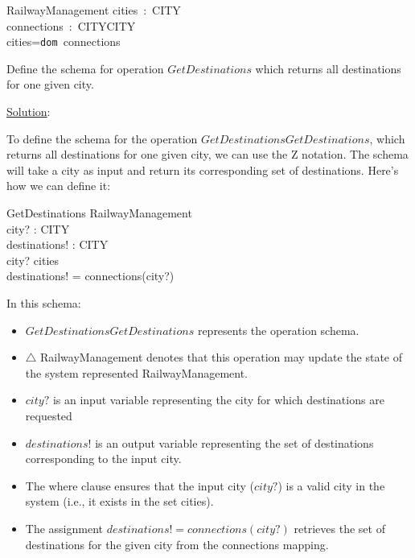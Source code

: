 \documentclass[12pt]{article}
\begin{document}
\begin{spacing}{1.5}
\begin{enumerate}
		      \begin{schema}{RailwayManagement}
		      	cities~:~CITY\\
		      	connections~:~CITY\nrightarrow{}CITY\\
		      	\where
		      	cities=\texttt{dom }connections
		      \end{schema}
		      		      
		      Define the schema for operation $GetDestinations$ which returns all destinations for one given city.
		      
		      \noindent \underline{Solution}:
		      
		      To define the schema for the operation $GetDestinationsGetDestinations$, which returns all destinations for one given city, we can use the Z notation. The schema will take a city as input and return its corresponding set of destinations. Here's how we can define it:
		      
		      \begin{schema}{GetDestinations}
		      	\Delta RailwayManagement \\
		      	city? : CITY \\
		      	destinations! : CITY \\
		      	\where
		      	city? \in cities \\
		      	destinations! = connections(city?) \\
		      \end{schema}
		      
		      In this schema:
		      \begin{itemize}
		      	\item $GetDestinationsGetDestinations$ represents the operation schema.
		      	\item $\triangle$ RailwayManagement denotes that this operation may update the state of the system represented RailwayManagement.
		      	\item $city?$ is an input variable representing the city for which destinations are requested
		      	\item $destinations!$ is an output variable representing the set of destinations corresponding to the input city.
		      	\item The where clause ensures that the input city ($city?$) is a valid city in the system (i.e., it exists in the set cities).
		      	\item The assignment $destinations!=connections(city?)$ retrieves the set of destinations for the given city from the connections mapping.
		      \end{itemize}
		      

\end{enumerate}
\end{spacing}
\end{document}
